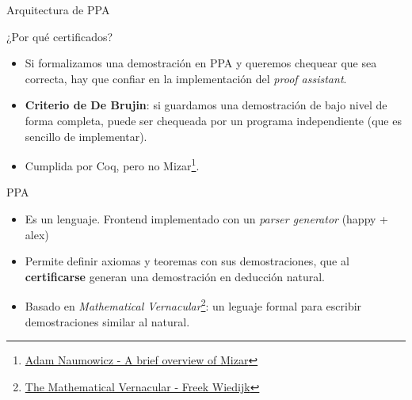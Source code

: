 \documentclass[xcolor={dvipsnames},spanish]{beamer}
\begin{document}


\begin{frame}{Arquitectura de PPA}

\begin{figure}
    \centering
\end{figure}

\end{frame}

\begin{frame}{¿Por qué certificados?}

    \begin{itemize}
        \item Si formalizamos una demostración en PPA y queremos chequear que sea correcta, hay que confiar en la implementación del \textit{proof assistant}.
        \item \textbf{Criterio de De Brujin}: si guardamos una demostración de bajo nivel de forma completa, puede ser chequeada por un programa independiente (que es sencillo de implementar).
        \item Cumplida por Coq, pero no Mizar\footnote{\href{https://www.researchgate.net/publication/225341870_A_Brief_Overview_of_Mizar}{Adam Naumowicz - A brief overview of Mizar}}.
    \end{itemize}

\end{frame}

\begin{frame}{PPA}
    \begin{itemize}
        \item Es un lenguaje. Frontend implementado con un \textit{parser generator} (happy + alex)
        \item Permite definir axiomas y teoremas con sus demostraciones, que al \textbf{certificarse} generan una demostración en deducción natural.
        \item Basado en \textit{Mathematical Vernacular}\footnote{\href{https://www.cs.ru.nl/~freek/notes/mv.pdf}{The Mathematical Vernacular - Freek Wiedijk}}: un leguaje formal para escribir demostraciones similar al natural.
    \end{itemize}
\end{frame}
\end{document}

